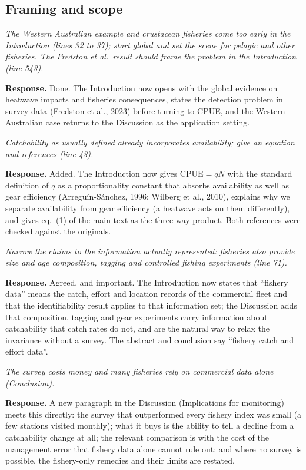 \documentclass[11pt,a4paper]{article}
\newcommand{\rev}[1]{\par\medskip\noindent\textit{\color{black!60}#1}\par\smallskip}
\newcommand{\resp}{\noindent\textbf{Response.} }
\begin{document}
\subsection*{Framing and scope}

\rev{The Western Australian example and crustacean fisheries come too early in the Introduction (lines 32 to 37); start global and set the scene for pelagic and other fisheries. The Fredston et al.\ result should frame the problem in the Introduction (line 543).}

\resp Done. The Introduction now opens with the global evidence on heatwave impacts and fisheries consequences, states the detection problem in survey data (Fredston et al., 2023) before turning to CPUE, and the Western Australian case returns to the Discussion as the application setting.

\rev{Catchability as usually defined already incorporates availability; give an equation and references (line 43).}

\resp Added. The Introduction now gives $\mathrm{CPUE} = qN$ with the standard definition of $q$ as a proportionality constant that absorbs availability as well as gear efficiency (Arregu\'in-S\'anchez, 1996; Wilberg et al., 2010), explains why we separate availability from gear efficiency (a heatwave acts on them differently), and gives eq.~(1) of the main text as the three-way product. Both references were checked against the originals.

\rev{Narrow the claims to the information actually represented: fisheries also provide size and age composition, tagging and controlled fishing experiments (line 71).}

\resp Agreed, and important. The Introduction now states that ``fishery data'' means the catch, effort and location records of the commercial fleet and that the identifiability result applies to that information set; the Discussion adds that composition, tagging and gear experiments carry information about catchability that catch rates do not, and are the natural way to relax the invariance without a survey. The abstract and conclusion say ``fishery catch and effort data''.

\rev{The survey costs money and many fisheries rely on commercial data alone (Conclusion).}

\resp A new paragraph in the Discussion (Implications for monitoring) meets this directly: the survey that outperformed every fishery index was small (a few stations visited monthly); what it buys is the ability to tell a decline from a catchability change at all; the relevant comparison is with the cost of the management error that fishery data alone cannot rule out; and where no survey is possible, the fishery-only remedies and their limits are restated.
\end{document}
